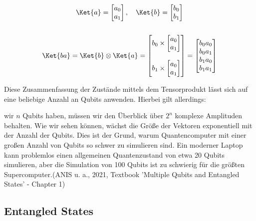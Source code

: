 \begin{equation} \begin{gathered}
        \Ket{a} = \begin{bmatrix} a_0 \\ a_1 \end{bmatrix}, \quad \Ket{b} = \begin{bmatrix} b_0 \\ b_1 \end{bmatrix}
        \\
        \\
        \Ket{ba} = \Ket{b} \otimes \Ket{a} =
        \begin{bmatrix}
            b_0 \times \begin{bmatrix}a_0\\a_1\end{bmatrix} \\ \\
            b_1 \times \begin{bmatrix}a_0\\a_1\end{bmatrix}
        \end{bmatrix}
        = \begin{bmatrix}b_0 a_0\\b_0 a_1\\b_1 a_0\\b_1 a_1\end{bmatrix}
    \end{gathered} \end{equation}

Diese Zusammenfassung der Zustände mittels dem Tensorprodukt lässt sich auf eine beliebige Anzahl an Qubits anwenden. Hierbei gilt allerdings:

\glqqWenn wir \(n\) Qubits haben, müssen wir den Überblick über \(2^n\) komplexe Amplituden behalten. Wie wir sehen können, wächst die Größe der Vektoren exponentiell mit der Anzahl der Qubits. Dies ist der Grund, warum Quantencomputer mit einer großen Anzahl von Qubits so schwer zu simulieren sind. Ein moderner Laptop kann problemlos einen allgemeinen Quantenzustand von etwa 20 Qubits simulieren, aber die Simulation von 100 Qubits ist zu schwierig für die größten Supercomputer.\grqq (ANIS u. a., 2021, Textbook ’Multiple Qubits and Entangled States’ - Chapter 1)


\newline  \newline
\subsection{Entangled States}
\newline

